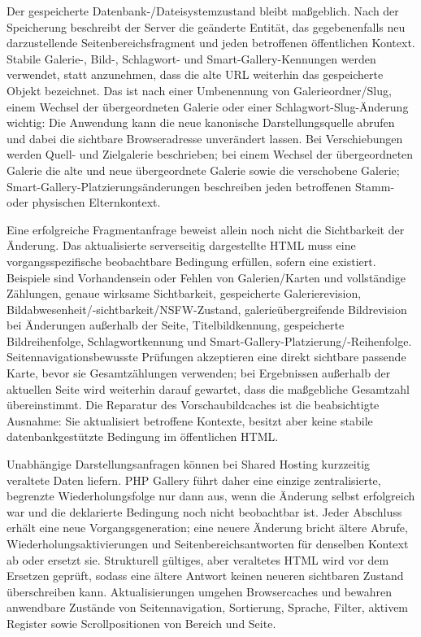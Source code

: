 \documentclass[11pt,a4paper]{article}
\begin{document}
Der gespeicherte Datenbank-/Dateisystemzustand bleibt maßgeblich. Nach der
Speicherung beschreibt der Server die geänderte Entität, das gegebenenfalls neu
darzustellende Seitenbereichsfragment und jeden betroffenen öffentlichen
Kontext. Stabile Galerie-, Bild-, Schlagwort- und Smart-Gallery-Kennungen werden
verwendet, statt anzunehmen, dass die alte URL weiterhin das gespeicherte Objekt
bezeichnet. Das ist nach einer Umbenennung von Galerieordner/Slug, einem Wechsel
der übergeordneten Galerie oder einer Schlagwort-Slug-Änderung wichtig: Die
Anwendung kann die neue kanonische Darstellungsquelle abrufen und dabei die
sichtbare Browseradresse unverändert lassen. Bei Verschiebungen werden Quell-
und Zielgalerie beschrieben; bei einem Wechsel der übergeordneten Galerie die
alte und neue übergeordnete Galerie sowie die verschobene Galerie;
Smart-Gallery-Platzierungsänderungen beschreiben jeden betroffenen Stamm- oder
physischen Elternkontext.

Eine erfolgreiche Fragmentanfrage beweist allein noch nicht die Sichtbarkeit der
Änderung. Das aktualisierte serverseitig dargestellte HTML muss eine
vorgangsspezifische beobachtbare Bedingung erfüllen, sofern eine existiert.
Beispiele sind Vorhandensein oder Fehlen von Galerien/Karten und vollständige
Zählungen, genaue wirksame Sichtbarkeit, gespeicherte Galerierevision,
Bildabwesenheit/-sichtbarkeit/NSFW-Zustand, galerieübergreifende Bildrevision
bei Änderungen außerhalb der Seite, Titelbildkennung, gespeicherte
Bildreihenfolge, Schlagwortkennung und Smart-Gallery-Platzierung/-Reihenfolge.
Seitennavigationsbewusste Prüfungen akzeptieren eine direkt sichtbare passende
Karte, bevor sie Gesamtzählungen verwenden; bei Ergebnissen außerhalb der
aktuellen Seite wird weiterhin darauf gewartet, dass die maßgebliche Gesamtzahl
übereinstimmt. Die Reparatur des Vorschaubildcaches ist die beabsichtigte
Ausnahme: Sie aktualisiert betroffene Kontexte, besitzt aber keine stabile
datenbankgestützte Bedingung im öffentlichen HTML.

Unabhängige Darstellungsanfragen können bei Shared Hosting kurzzeitig veraltete
Daten liefern. PHP Gallery führt daher eine einzige zentralisierte, begrenzte
Wiederholungsfolge nur dann aus, wenn die Änderung selbst erfolgreich war und
die deklarierte Bedingung noch nicht beobachtbar ist. Jeder Abschluss erhält
eine neue Vorgangsgeneration; eine neuere Änderung bricht ältere Abrufe,
Wiederholungsaktivierungen und Seitenbereichsantworten für denselben Kontext ab
oder ersetzt sie. Strukturell gültiges, aber veraltetes HTML wird vor dem
Ersetzen geprüft, sodass eine ältere Antwort keinen neueren sichtbaren Zustand
überschreiben kann. Aktualisierungen umgehen Browsercaches und bewahren
anwendbare Zustände von Seitennavigation, Sortierung, Sprache, Filter, aktivem
Register sowie Scrollpositionen von Bereich und Seite.
\end{document}
